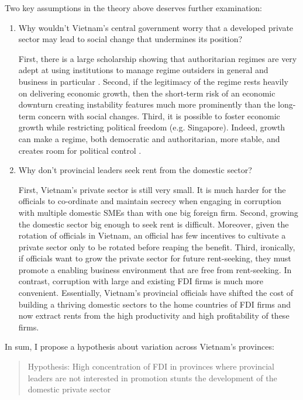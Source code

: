 \documentclass[12pt]{article}
\begin{document}
Two key assumptions in the theory above deserves further examination:
\begin{enumerate}
\item Why wouldn't Vietnam's central government worry that a developed private sector may lead to social change that undermines its position?

First, there is a large scholarship showing that authoritarian regimes are very adept at using institutions to manage regime outsiders in general and business in particular \citep{Gandhi2006, Gandhi2008, Wright2008, Le2015}. Second, if the legitimacy of the regime rests heavily on delivering economic growth, then the short-term risk of an economic downturn creating instability features much more prominently than the long-term concern with social changes. Third, it is possible to foster economic growth while restricting political freedom (e.g. Singapore). Indeed, growth can make a regime, both democratic and authoritarian, more stable, and creates room for political control \citep{Przeworski1997}.

\item Why don't provincial leaders seek rent from the domestic sector? 

First, Vietnam's private sector is still very small. It is much harder for the officials to co-ordinate and maintain secrecy when engaging in corruption with multiple domestic SMEs than with one big foreign firm. Second, growing the domestic sector big enough to seek rent is difficult. Moreover, given the rotation of officials in Vietnam, an official has few incentives to cultivate a private sector only to be rotated before reaping the benefit. Third, ironically, if officials want to grow the private sector for future rent-seeking, they must promote a enabling business environment that are free from rent-seeking. In contrast, corruption with large and existing FDI firms is much more convenient. Essentially, Vietnam's provincial officials have shifted the cost of building a thriving domestic sectors to the home countries of FDI firms and now extract rents from the high productivity and high profitability of these firms. 

\end{enumerate}


In sum, I propose a hypothesis about variation across Vietnam's provinces:

\begin{quote}
Hypothesis: High concentration of FDI in provinces where provincial leaders are not interested in promotion stunts the development of the domestic private sector
\end{quote}
\end{document}

